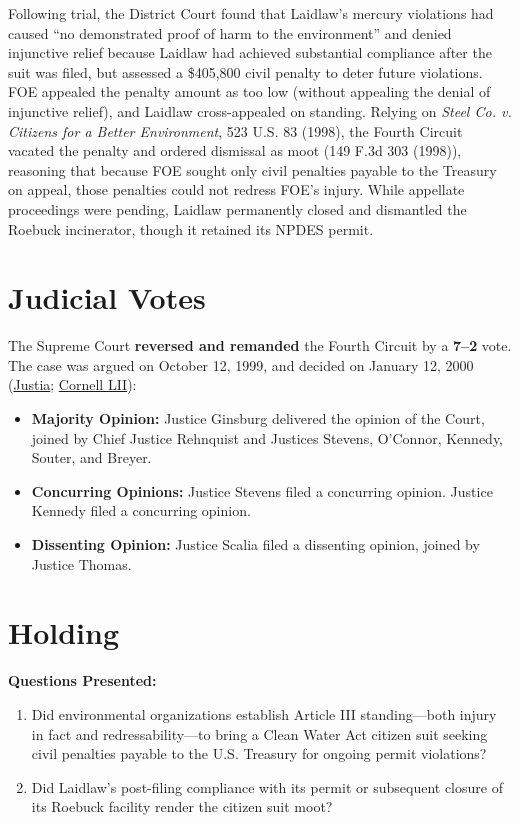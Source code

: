 \documentclass[12pt]{article}
\begin{document}
Following trial, the District Court found that Laidlaw's mercury violations had caused ``no demonstrated proof of harm to the environment'' and denied injunctive relief because Laidlaw had achieved substantial compliance after the suit was filed, but assessed a \$405,800 civil penalty to deter future violations. FOE appealed the penalty amount as too low (without appealing the denial of injunctive relief), and Laidlaw cross-appealed on standing. Relying on \textit{Steel Co. v. Citizens for a Better Environment}, 523 U.S. 83 (1998), the Fourth Circuit vacated the penalty and ordered dismissal as moot (149 F.3d 303 (1998)), reasoning that because FOE sought only civil penalties payable to the Treasury on appeal, those penalties could not redress FOE's injury. While appellate proceedings were pending, Laidlaw permanently closed and dismantled the Roebuck incinerator, though it retained its NPDES permit.

\section{Judicial Votes}
The Supreme Court \textbf{reversed and remanded} the Fourth Circuit by a \textbf{7--2} vote. The case was argued on October 12, 1999, and decided on January 12, 2000 (\href{https://supreme.justia.com/cases/federal/us/528/167/}{Justia}; \href{https://www.law.cornell.edu/supremecourt/text/528/167}{Cornell LII}):

\begin{itemize}
    \item \textbf{Majority Opinion:} Justice Ginsburg delivered the opinion of the Court, joined by Chief Justice Rehnquist and Justices Stevens, O'Connor, Kennedy, Souter, and Breyer.
    \item \textbf{Concurring Opinions:} Justice Stevens filed a concurring opinion. Justice Kennedy filed a concurring opinion.
    \item \textbf{Dissenting Opinion:} Justice Scalia filed a dissenting opinion, joined by Justice Thomas.
\end{itemize}

\section{Holding}
\textbf{Questions Presented:}

\begin{enumerate}
  \item Did environmental organizations establish Article III standing---both injury in fact and redressability---to bring a Clean Water Act citizen suit seeking civil penalties payable to the U.S. Treasury for ongoing permit violations?
  \item Did Laidlaw's post-filing compliance with its permit or subsequent closure of its Roebuck facility render the citizen suit moot?
\end{enumerate}
\end{document}
